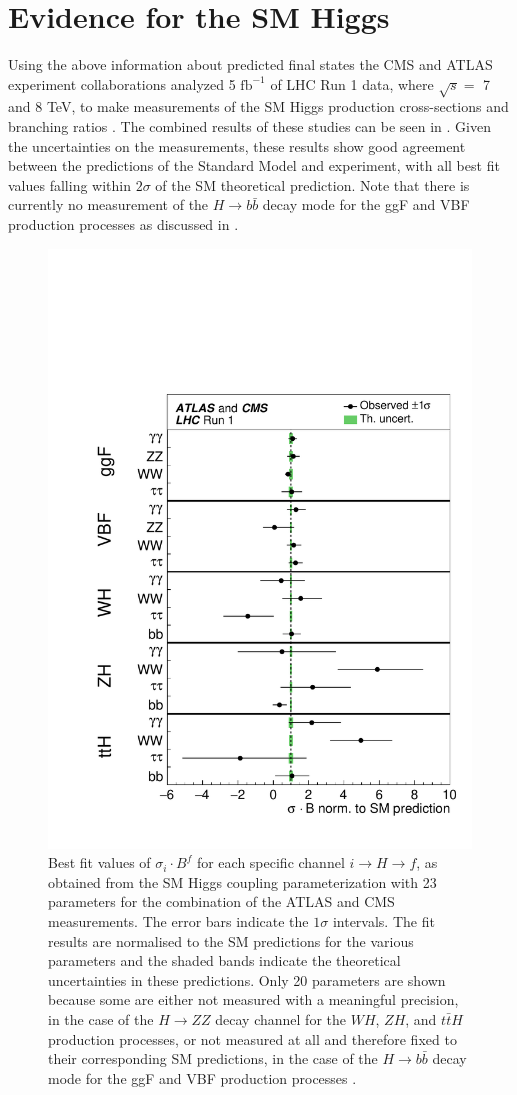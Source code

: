 \section{Evidence for the SM Higgs} \label{sec:higgs:higgs_evidence}

Using the above information about predicted final states the CMS and ATLAS
experiment collaborations analyzed 5 $\text{fb}^{-1}$ of LHC Run 1 data, where
$\sqrt{s} = $ 7 and 8 TeV, to make measurements of the SM Higgs production
cross-sections and branching ratios \cite{Khachatryan:2016vau}.  The combined
results of these studies can be seen in
.
Given the uncertainties on the measurements, these results show good agreement
between the predictions of the Standard Model and experiment, with all best fit
values falling within $2\sigma$ of the SM theoretical prediction. Note that
there is currently no measurement of the $H \rightarrow b\bar{b}$ decay mode
for the ggF and VBF production processes  as discussed in
.

\begin{figure}[!htbp]
  \begin{center}
    \includegraphics[width=0.5\linewidth]{figures/higgs/higgs_production_measurement.pdf}
    \caption{ Best fit values of $\sigma_{i} \cdot B^{f}$ for each specific channel $i \rightarrow H \rightarrow f$, as obtained from the SM Higgs coupling parameterization with 23 parameters for the combination of the ATLAS and CMS measurements. The error bars indicate the $1\sigma$ intervals. The fit results are normalised to the SM predictions for the various parameters and the shaded bands indicate the theoretical uncertainties in these predictions. Only 20 parameters are shown because some are either not measured with a meaningful precision, in the case of the $H \rightarrow ZZ$ decay channel for the $WH$, $ZH$, and $t\bar{t}H$ production processes, or not measured at all and therefore fixed to their corresponding SM predictions, in the case of the $H \rightarrow b\bar{b}$ decay mode for the ggF and VBF production processes \cite{Khachatryan:2016vau}.}
    \label{fig:higgs_production_measurement}
  \end{center}
\end{figure}

